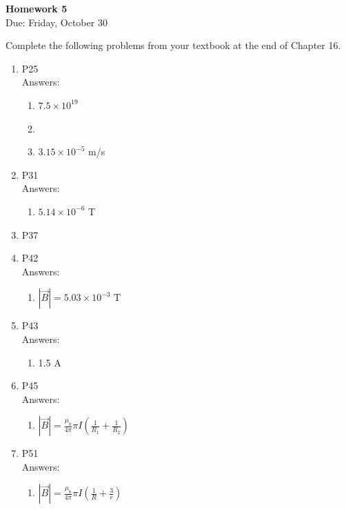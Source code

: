 \documentclass{article}
\begin{document}
\fancyfoot[C]{\thepage}
\vspace*{0cm}
\begin{center}
	{\LARGE \textbf{Homework 5}}\\
	\vspace{0.25cm}
	{\Large Due: Friday, October 30}
\end{center}

Complete the following problems from your textbook at the end of Chapter 16.
\begin{enumerate}
\item P25\\
Answers:
\begin{enumerate}
	\item $7.5\times10^{19}$
	\item 
	\item $3.15\times10^{-5}$ m/s
\end{enumerate}
\item P31\\
Answers:
\begin{enumerate}
	\item $5.14\times10^{-6}$ T
\end{enumerate}
\item P37
\item P42\\Answers:
\begin{enumerate}
	\item $|\vec{B}|=5.03\times10^{-3}$ T 
\end{enumerate} 
\item P43\\Answers:
\begin{enumerate}
	\item 1.5 A
\end{enumerate}
\item P45\\Answers:
\begin{enumerate}
	\item $|\vec{B}|=\frac{\mu_0}{4\pi}\pi I\left(\frac{1}{R_1}+\frac{1}{R_2}\right)$
\end{enumerate}
\item P51\\Answers:
\begin{enumerate}
	\item $|\vec{B}|=\frac{\mu_0}{4\pi}\pi I\left(\frac{1}{R}+\frac{3}{r}\right)$
\end{enumerate}
\end{enumerate}
\end{document}
